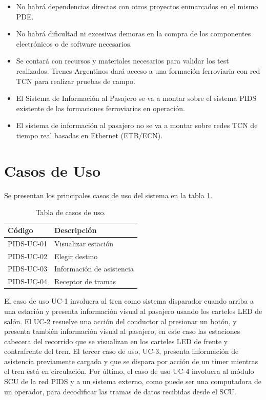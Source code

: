 \begin{itemize}
\item No habrá dependencias directas con otros proyectos enmarcados en el mismo PDE\cite{PDE-TCN}.
\item No habrá dificultad ni excesivas demoras en la compra de los componentes electrónicos o
de software necesarios.
\item Se contará con recursos y materiales necesarios para validar los test realizados.
Trenes Argentinos dará acceso a una formación ferroviaria con red TCN para realizar
pruebas de campo.
\item El Sistema de Información al Pasajero se va a montar sobre el sistema PIDS existente de
las formaciones ferroviarias en operación.
\item El sistema de información al pasajero no se va a montar sobre redes TCN de tiempo real
basadas en Ethernet (ETB/ECN).
\end{itemize}


\pagebreak
\section{Casos de Uso}

Se presentan los principales casos de uso del sistema en la tabla \ref{tab:UseCases}. 

\begin{center}
\begin{table}[htb]
\begin{tabular}{|l|l|}
\hline
\textbf{Código} & \textbf{Descripción}     \\ \hline
PIDS-UC-01  & Visualizar estación         \\ \hline
PIDS-UC-02  & Elegir destino             \\ \hline
PIDS-UC-03  & Información de asistencia \\ \hline
PIDS-UC-04  & Receptor de tramas       \\ \hline
\end{tabular}
	\caption{Tabla de casos de uso.}
	\label{tab:UseCases}
\end{table}
\end{center}

El caso de uso UC-1 involucra al tren como sistema disparador cuando arriba a una estación y presenta información visual al pasajero usando los carteles LED de salón. El UC-2 resuelve una acción del conductor al presionar un botón, y presenta también información visual al pasajero, en este caso las estaciones cabecera del recorrido que se visualizan en los carteles LED de frente y contrafrente del tren. El tercer caso de uso, UC-3, presenta información de asistencia previamente cargada y que se dispara por acción de un timer mientras el tren está en circulación. Por último, el caso de uso UC-4 involucra al módulo SCU de la red PIDS y a un sistema externo, como puede ser una computadora de un operador, para decodificar las tramas de datos recibidas desde el SCU.\\


